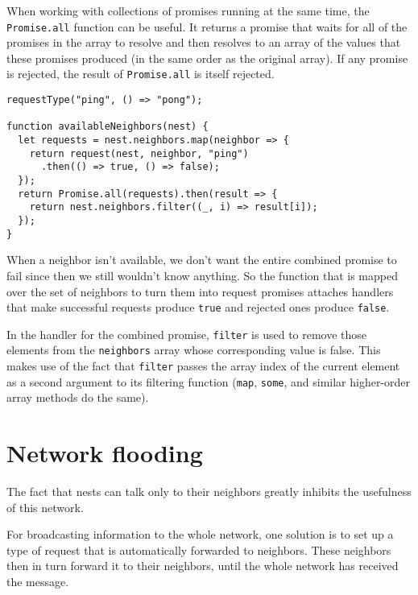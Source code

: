 When working with collections of promises running at the same time, the \lstinline`Promise.all` function can be useful. It returns a promise that waits for all of the promises in the array to resolve and then resolves to an array of the values that these promises produced (in the same order as the original array). If any promise is rejected, the result of \lstinline`Promise.all` is itself rejected.

\begin{lstlisting}
requestType("ping", () => "pong");

function availableNeighbors(nest) {
  let requests = nest.neighbors.map(neighbor => {
    return request(nest, neighbor, "ping")
      .then(() => true, () => false);
  });
  return Promise.all(requests).then(result => {
    return nest.neighbors.filter((_, i) => result[i]);
  });
}
\end{lstlisting}
\noindent{}

When a neighbor isn't available, we don't want the entire combined promise to fail since then we still wouldn't know anything. So the function that is mapped over the set of neighbors to turn them into request promises attaches handlers that make successful requests produce \lstinline`true` and rejected ones produce \lstinline`false`.

In the handler for the combined promise, \lstinline`filter` is used to remove those elements from the \lstinline`neighbors` array whose corresponding value is false. This makes use of the fact that \lstinline`filter` passes the array index of the current element as a second argument to its filtering function (\lstinline`map`, \lstinline`some`, and similar higher-order array methods do the same).

\section{Network flooding}

The fact that nests can talk only to their neighbors greatly inhibits the usefulness of this network.

For broadcasting information to the whole network, one solution is to set up a type of request that is automatically forwarded to neighbors. These neighbors then in turn forward it to their neighbors, until the whole network has received the message.

